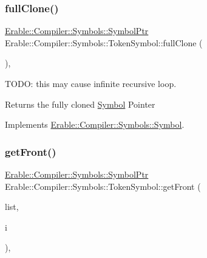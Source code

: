 \mbox{\label{class_erable_1_1_compiler_1_1_symbols_1_1_token_symbol_a5907d3f99334de4f74fba1c1598de83a}} 
\subsubsection{\texorpdfstring{fullClone()}{fullClone()}}
{\footnotesize\ttfamily \mbox{\hyperlink{namespace_erable_1_1_compiler_1_1_symbols_a8f0bc762f448ea4d84e8713ab3e140b9}{Erable\+::\+Compiler\+::\+Symbols\+::\+Symbol\+Ptr}} Erable\+::\+Compiler\+::\+Symbols\+::\+Token\+Symbol\+::full\+Clone (\begin{DoxyParamCaption}{ }\end{DoxyParamCaption})\hspace{0.3cm}{\ttfamily [override]}, {\ttfamily [virtual]}}

T\+O\+DO\+: this may cause infinite recursive loop. \begin{DoxyReturn}{Returns}
the fully cloned \mbox{\hyperlink{class_erable_1_1_compiler_1_1_symbols_1_1_symbol}{Symbol}} Pointer 
\end{DoxyReturn}


Implements \mbox{\hyperlink{class_erable_1_1_compiler_1_1_symbols_1_1_symbol_a23ed5c4b948000c29af03c846abc12fc}{Erable\+::\+Compiler\+::\+Symbols\+::\+Symbol}}.

\mbox{\label{class_erable_1_1_compiler_1_1_symbols_1_1_token_symbol_adc686a4c091111b65323fe75ddfef6b9}} 
\subsubsection{\texorpdfstring{getFront()}{getFront()}}
{\footnotesize\ttfamily \mbox{\hyperlink{namespace_erable_1_1_compiler_1_1_symbols_a8f0bc762f448ea4d84e8713ab3e140b9}{Erable\+::\+Compiler\+::\+Symbols\+::\+Symbol\+Ptr}} Erable\+::\+Compiler\+::\+Symbols\+::\+Token\+Symbol\+::get\+Front (\begin{DoxyParamCaption}\item[{\mbox{\hyperlink{namespace_erable_1_1_compiler_1_1_symbols_a63e8157d2f729d4689d27bacad42f8ed}{Symbol\+List}} \&}]{list,  }\item[{int}]{i }\end{DoxyParamCaption})\hspace{0.3cm}{\ttfamily [override]}, {\ttfamily [virtual]}}



